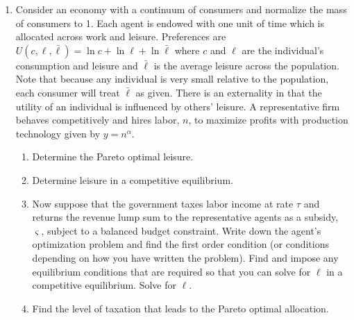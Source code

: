 \documentclass{article}
\begin{document}
\begin{enumerate}
\begin{enumerate}
\begin{enumerate}
\item Find $n$ in a competitive equilibrium.
\end{enumerate}

\item Now suppose the situation is the same, except the representative agent
values the government spending such that preferences are $U=\ln c+\beta \ln
\ell +\theta \ln G$ where still $G=gy$ and $G$ is still taken as given by
the agent. In this setting the social planner chooses $g$. State the social
planner's problem and solve the social planner's problem for the optimal
amount of $n$ and $g$.
\end{enumerate}

\item Consider an economy with a continuum of consumers and normalize the
mass of consumers to 1. Each agent is endowed with one unit of time which is
allocated across work and leisure. Preferences are $U\left( c,\ell ,\bar{\ell%
}\right) =\ln c+\ln \ell +\ln \bar{\ell}$ where $c$ and $\ell $ are the
individual's consumption and leisure and $\bar{\ell}$ is the average leisure
across the population. Note that because any individual is very small
relative to the population, each consumer will treat $\bar{\ell}$ as given.
There is an externality in that the utility of an individual is influenced
by others' leisure. A representative firm behaves competitively and hires
labor, $n$, to maximize profits with production technology given by $%
y=n^{\alpha }$.

\begin{enumerate}
\item Determine the Pareto optimal leisure.

\item Determine leisure in a competitive equilibrium.

\item Now suppose that the government taxes labor income at rate $\tau $ and
returns the revenue lump sum to the representative agents as a subsidy, $%
\varsigma $, subject to a balanced budget constraint. Write down the agent's
optimization problem and find the first order condition (or conditions
depending on how you have written the problem). Find and impose any
equilibrium conditions that are required so that you can solve for $\ell $
in a competitive equilibrium. Solve for $\ell .$

\item Find the level of taxation that leads to the Pareto optimal allocation.
\end{enumerate}


\end{enumerate}
\end{document}
